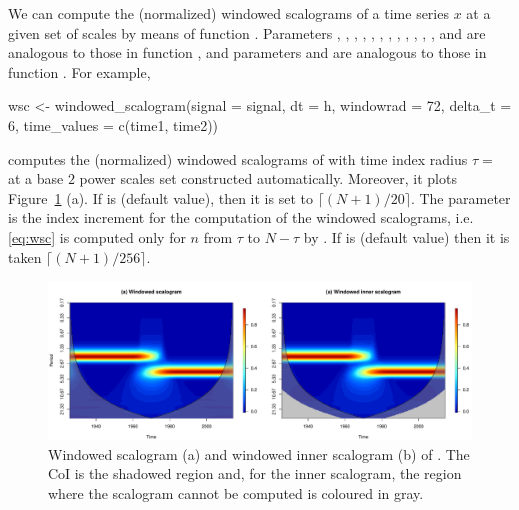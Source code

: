We can compute the (normalized) windowed scalograms of a time series $x$ at a given set of scales by means of function . Parameters , , , , , , , , , , , ,  and  are analogous to those in function , and parameters  and  are analogous to those in function . For example,
\begin{example}
wsc <- windowed_scalogram(signal = signal, dt = h,
                          windowrad = 72, delta_t = 6,
                          time_values = c(time1, time2))
\end{example}
computes the (normalized) windowed scalograms of  with time index radius $\tau =\,$ at a base $2$ power scales set constructed automatically. Moreover, it plots Figure~\ref{fig:wsc} (a). If  is  (default value), then it is set to $\lceil (N+1)/20\rceil $. The parameter  is the index increment for the computation of the windowed scalograms, i.e. \eqref{eq:wsc} is computed only for $n$ from $\tau $ to $N-\tau $ by . If  is  (default value) then it is taken $\lceil (N+1)/256\rceil $.

\begin{figure}[tbp]
\begin{center}
  \includegraphics[width=1\textwidth]{Figure5}
\end{center}
\caption{Windowed scalogram (a) and windowed inner scalogram (b) of . The CoI is the shadowed region and, for the inner scalogram, the region where the scalogram cannot be computed is coloured in gray.}
\label{fig:wsc}
\end{figure}

